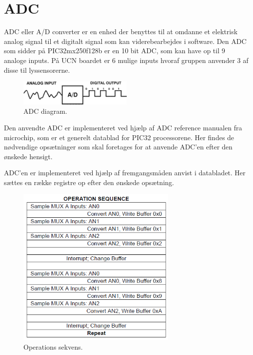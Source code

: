 \section{ADC}
\label{adc_ref}
ADC eller A/D converter er en enhed der benyttes til at omdanne et elektrisk analog signal til et digitalt signal som kan viderebearbejdes i software. 
Den ADC som sidder på PIC32mx250f128b \cite{pic32mx} er en 10 bit ADC, som kan have op til 9 analoge inputs. På UCN boardet er 6 mulige inputs hvoraf gruppen  anvender 3 af disse til lyssensorerne. 

\begin{figure}[h!]
  \centering
  \includegraphics[width=0.5\textwidth]{figures/A_D_converter.png}
  \caption{ADC diagram.\cite{ADC_figur}}
  \label{adcDiagram}
\end{figure} 

Den anvendte ADC er implementeret ved hjælp af ADC reference manualen fra microchip, som er et generelt datablad for PIC32 processorene. Her findes de nødvendige opsætninger som skal foretages for at anvende ADC'en efter den ønskede hensigt.
\newline

ADC'en er implementeret ved hjælp af fremgangsmåden anvist i databladet. Her sættes en række registre op efter den ønskede opsætning. 

\begin{figure}[h!]
  \centering
  \includegraphics[width=0.7\textwidth]{figures/operation_sequence.png}
  \caption{Operations sekvens.}
  \label{handlingsekvens}
\end{figure} 

